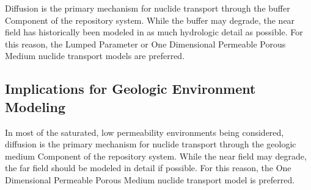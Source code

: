 Diffusion is the primary mechanism for nuclide transport through the 
buffer Component of the repository system. While the buffer may degrade, the 
near field has historically been modeled in as much hydrologic detail as 
possible. For this reason, the Lumped Parameter or One Dimensional Permeable 
Porous Medium nuclide transport models are preferred.

\subsection{Implications for Geologic Environment Modeling}

In most of the saturated, low permeability environments being considered, 
diffusion is the primary mechanism for nuclide transport through the geologic 
medium Component of the repository system. While the near field may degrade, 
the far field should be modeled in detail if possible. For this reason, the 
One Dimensional Permeable Porous Medium nuclide transport 
model is preferred.
